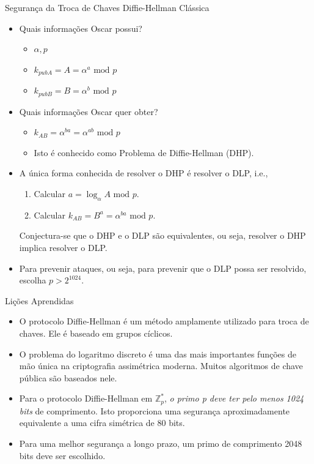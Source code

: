\documentclass{beamer}
\begin{document}
\begin{frame}{Segurança da Troca de Chaves Diffie-Hellman Clássica}
    \small %
    \begin{itemize}
        \item Quais informações Oscar possui?
        \begin{itemize}
            \item $\alpha, p$
            \item $k_{pubA} = A = \alpha^a \text{ mod } p$
            \item $k_{pubB} = B = \alpha^b \text{ mod } p$
        \end{itemize}
        \item Quais informações Oscar quer obter?
        \begin{itemize}
            \item $k_{AB} = \alpha^{ba} = \alpha^{ab} \text{ mod } p$
            \item Isto é conhecido como Problema de Diffie-Hellman (DHP).
        \end{itemize}
        \item A única forma conhecida de resolver o DHP é resolver o DLP, i.e.,
        \begin{enumerate}
            \item Calcular $a = \log_{\alpha} A \text{ mod } p$.
            \item Calcular $k_{AB} = B^a = \alpha^{ba} \text{ mod } p$.
        \end{enumerate}
        Conjectura-se que o DHP e o DLP são equivalentes, ou seja, resolver o DHP implica resolver o DLP.
        \item Para prevenir ataques, ou seja, para prevenir que o DLP possa ser resolvido, escolha $p > 2^{1024}$.
    \end{itemize}
\end{frame}

\begin{frame}{Lições Aprendidas}
    \begin{itemize}
        \item O protocolo Diffie-Hellman é um método amplamente utilizado para troca de chaves. Ele é baseado em grupos cíclicos.
        \item O problema do logaritmo discreto é uma das mais importantes funções de mão única na criptografia assimétrica moderna. Muitos algoritmos de chave pública são baseados nele.
        \item Para o protocolo Diffie-Hellman em $\mathbb{Z}_p^*$, \textit{o primo p deve ter pelo menos 1024 bits} de comprimento. Isto proporciona uma segurança aproximadamente equivalente a uma cifra simétrica de 80 bits.
        \item Para uma melhor segurança a longo prazo, um primo de comprimento 2048 bits deve ser escolhido.
    \end{itemize}
\end{frame}
\end{document}
